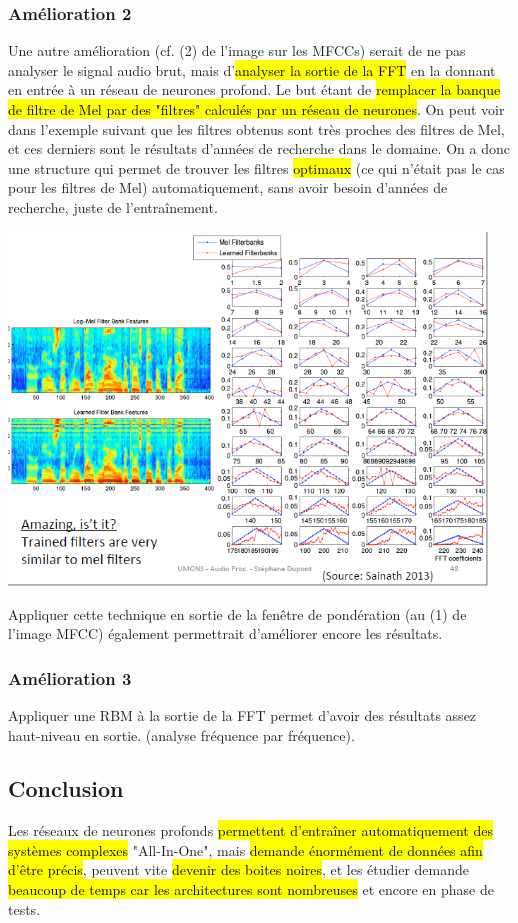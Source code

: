 \documentclass[letterpaper, 12pt]{article}
\newcommand{\alinea}{
\hspace*{0.5cm}}
\begin{document}
			\subsubsection{Amélioration 2}
				\alinea Une autre amélioration (cf. (2) de l'image sur les MFCCs) serait de ne pas analyser le signal audio 
					brut, mais d'\hl{analyser la sortie de la FFT} en la donnant en entrée à un réseau de neurones profond.
					Le but étant de \hl{remplacer la banque de filtre de Mel par des "filtres" calculés par un réseau de neurones}.
					On peut voir dans l'exemple suivant que les filtres obtenus sont très proches des filtres de Mel, et ces 
					derniers sont le résultats d'années de recherche dans le domaine. On a donc une structure qui permet de trouver
					les filtres \hl{optimaux} (ce qui n'était pas le cas pour les filtres de Mel) automatiquement, sans avoir 
					besoin d'années de recherche, juste de l'entraînement.
				\begin{center}
					\includegraphics[width=5in]{Images/mel}
				\end{center}
				\alinea Appliquer cette technique en sortie de la fenêtre de pondération (au (1) de l'image MFCC) également 
					permettrait d'améliorer encore les résultats.
			\subsubsection{Amélioration 3}
				\alinea Appliquer une RBM à la sortie de la FFT permet d'avoir des résultats assez haut-niveau en sortie. 
					(analyse fréquence par fréquence).
		\subsection{Conclusion}
			\alinea Les réseaux de neurones profonds \hl{permettent d'entraîner automatiquement des systèmes complexes} "All-In-One", 
				mais \hl{demande énormément de données afin d'être précis}, peuvent vite \hl{devenir des boites noires}, et les étudier 
				demande \hl{beaucoup de temps car les architectures sont nombreuses} et encore en phase de tests.
%
\pagebreak
%
\end{document}
